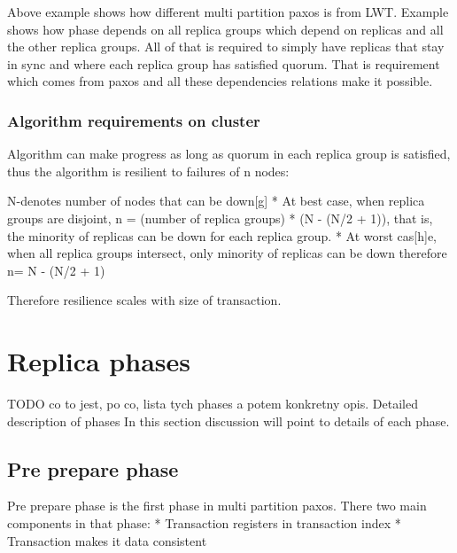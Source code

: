 Above example shows how different multi partition paxos is from LWT. Example shows how phase depends on all replica groups which depend on replicas and all the other replica groups. All of that is required to simply have replicas that stay in sync and where each replica group has satisfied quorum. That is requirement which comes from paxos and all these dependencies relations make it possible.


\subsubsection{Algorithm requirements on cluster}
Algorithm can make progress as long as quorum in each replica group is satisfied, thus the algorithm is resilient to failures of n nodes:


        N-denotes number of nodes that can be down[g]
* At best case, when replica groups are disjoint, n = (number of replica groups) * (N - (N/2 + 1)), that is, the minority of replicas can be down for each replica group.
* At worst cas[h]e, when all replica groups intersect, only minority of replicas can be down therefore n= N - (N/2 + 1)



Therefore resilience scales with size of transaction.


\section{Replica phases}
TODO co to jest, po co, lista tych phases a potem konkretny opis.
        Detailed description of phases
In this section discussion will point to details of each phase.


\subsection{Pre prepare phase}
Pre prepare phase is the first phase in multi partition paxos. There two main components in that phase:
* Transaction registers in transaction index 
* Transaction makes it data consistent


